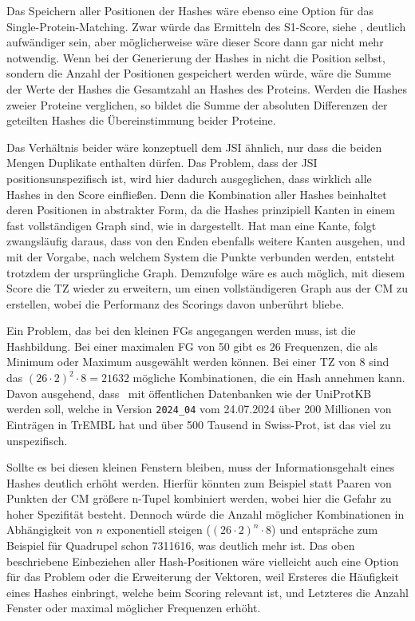         Das Speichern aller Positionen der Hashes wäre ebenso eine Option für das Single-Protein-Matching. Zwar würde das Ermitteln des S1-Score, siehe , deutlich aufwändiger sein, aber möglicherweise wäre dieser Score dann gar nicht mehr notwendig. Wenn bei der Generierung der Hashes in  nicht die Position selbst, sondern die Anzahl der Positionen gespeichert werden würde, wäre die Summe der Werte der Hashes die Gesamtzahl an Hashes des Proteins. Werden die Hashes zweier Proteine verglichen, so bildet die Summe der absoluten Differenzen der geteilten Hashes die Übereinstimmung beider Proteine.

        Das Verhältnis beider wäre konzeptuell dem \ac{JSI} ähnlich, nur dass die beiden Mengen Duplikate enthalten dürfen. Das Problem, dass der \ac{JSI} positionsunspezifisch ist, wird hier dadurch ausgeglichen, dass wirklich alle Hashes in den Score einfließen. Denn die Kombination aller Hashes beinhaltet deren Positionen in abstrakter Form, da die Hashes prinzipiell Kanten in einem fast vollständigen Graph sind, wie in  dargestellt. Hat man eine Kante, folgt zwangsläufig daraus, dass von den Enden ebenfalls weitere Kanten ausgehen, und mit der Vorgabe, nach welchem System die Punkte verbunden werden, entsteht trotzdem der ursprüngliche Graph. Demzufolge wäre es auch möglich, mit diesem Score die \ac{TZ} wieder zu erweitern, um einen vollständigeren Graph aus der \acf{CM} zu erstellen, wobei die Performanz des Scorings davon unberührt bliebe.

        Ein Problem, das bei den kleinen \acp{FG} angegangen werden muss, ist die Hashbildung. Bei einer maximalen \ac{FG} von 50 gibt es 26 Frequenzen, die als Minimum oder Maximum ausgewählt werden können. Bei einer \ac{TZ} von 8 sind das ${(26 \cdot 2)}^{2} \cdot 8 = 21632$ mögliche Kombinationen, die ein Hash annehmen kann. Davon ausgehend, dass \protfin\ mit öffentlichen Datenbanken wie der UniProtKB \autocite{uniprot} werden soll, welche in Version \texttt{2024\_04} vom 24.07.2024 über 200 Millionen von Einträgen in TrEMBL hat und über 500 Tausend in Swiss-Prot, ist das viel zu unspezifisch.

        Sollte es bei diesen kleinen Fenstern bleiben, muss der Informationsgehalt \autocite{shannon} eines Hashes deutlich erhöht werden. Hierfür könnten zum Beispiel statt Paaren von Punkten der \ac{CM} größere n-Tupel kombiniert werden, wobei hier die Gefahr zu hoher Spezifität besteht. Dennoch würde die Anzahl möglicher Kombinationen in Abhängigkeit von $n$ exponentiell steigen ($(26 \cdot 2)^{n}\cdot 8$) und entspräche zum Beispiel für Quadrupel schon 7311616, was deutlich mehr ist. Das oben beschriebene Einbeziehen aller Hash-Positionen wäre vielleicht auch eine Option für das Problem oder die Erweiterung der Vektoren, weil Ersteres die Häufigkeit eines Hashes einbringt, welche beim Scoring relevant ist, und Letzteres die Anzahl Fenster oder maximal möglicher Frequenzen erhöht.


